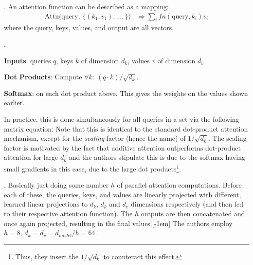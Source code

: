 \documentclass[11pt]{article}
\newcommand\myspace[1][]{\vspace{#1\bigskipamount}}
\newcommand\p{\Needspace{10\baselineskip} \noindent}
\begin{document}
\myspace
\p {}. An attention function can be described as a mapping:
\begin{align}
	\text{Attn(query, }\{(k_1, v_1), \ldots, \}\text{)} 
	&\Rightarrow \sum_i fn(\text{query}, k_i) v_i
\end{align}
where the query, keys, values, and output are all vectors. 
\begin{compactitem}
	\item {}.
	\begin{compactenum}
		\item \textbf{Inputs}: queries $q$, keys $k$ of dimension $d_k$, values $v$ of dimension $d_v$
		\item \textbf{Dot Products}: Compute $\forall k:~ (q \cdot k) / \sqrt{d_k}$. 
		\item \textbf{Softmax}: on each dot product above. This gives the weights on the values shown earlier.
	\end{compactenum}
	In practice, this is done simultaneously for all queries in a set via the following matrix equation:
	Note that this is identical to the standard dot-product attention mechanism, except for the \textit{scaling} factor (hence the name) of $1/\sqrt{d_k}$. The scaling factor is motivated by the fact that additive attention outperforms dot-product attention for large $d_k$ and the authors stipulate this is due to the softmax having small gradients in this case, due to the large dot products\footnote{Thus, they insert the $1/\sqrt{d_k}$ to counteract this effect.}. 
	
	
	\item {}. Basically just doing some number $h$ of parallel attention computations. Before each of these, the queries, keys, and values are linearly projected with different,
	learned linear projections to $d_k$, $d_k$ and $d_v$ dimensions respectively (and then fed to their respective attention function). The $h$ outputs are then concatenated and once again projected, resulting in the final values.
	The authors employ $h = 8$, $d_k = d_v = d_{model} / h = 64$. 
\end{compactitem}
\end{document}
